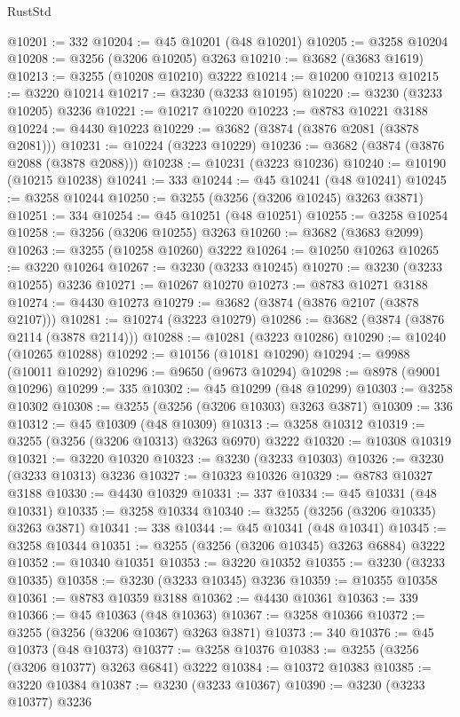 \begin{lexlean}{RustStd}
\begin{coremodule}
@10201 := 332
@10204 := @45 @10201 (@48 @10201)
@10205 := @3258 @10204
@10208 := @3256 (@3206 @10205) @3263
@10210 := @3682 (@3683 @1619)
@10213 := @3255 (@10208 @10210) @3222
@10214 := @10200 @10213
@10215 := @3220 @10214
@10217 := @3230 (@3233 @10195)
@10220 := @3230 (@3233 @10205) @3236
@10221 := @10217 @10220
@10223 := @8783 @10221 @3188
@10224 := @4430 @10223
@10229 := @3682 (@3874 (@3876 @2081 (@3878 @2081)))
@10231 := @10224 (@3223 @10229)
@10236 := @3682 (@3874 (@3876 @2088 (@3878 @2088)))
@10238 := @10231 (@3223 @10236)
@10240 := @10190 (@10215 @10238)
@10241 := 333
@10244 := @45 @10241 (@48 @10241)
@10245 := @3258 @10244
@10250 := @3255 (@3256 (@3206 @10245) @3263 @3871)
@10251 := 334
@10254 := @45 @10251 (@48 @10251)
@10255 := @3258 @10254
@10258 := @3256 (@3206 @10255) @3263
@10260 := @3682 (@3683 @2099)
@10263 := @3255 (@10258 @10260) @3222
@10264 := @10250 @10263
@10265 := @3220 @10264
@10267 := @3230 (@3233 @10245)
@10270 := @3230 (@3233 @10255) @3236
@10271 := @10267 @10270
@10273 := @8783 @10271 @3188
@10274 := @4430 @10273
@10279 := @3682 (@3874 (@3876 @2107 (@3878 @2107)))
@10281 := @10274 (@3223 @10279)
@10286 := @3682 (@3874 (@3876 @2114 (@3878 @2114)))
@10288 := @10281 (@3223 @10286)
@10290 := @10240 (@10265 @10288)
@10292 := @10156 (@10181 @10290)
@10294 := @9988 (@10011 @10292)
@10296 := @9650 (@9673 @10294)
@10298 := @8978 (@9001 @10296)
@10299 := 335
@10302 := @45 @10299 (@48 @10299)
@10303 := @3258 @10302
@10308 := @3255 (@3256 (@3206 @10303) @3263 @3871)
@10309 := 336
@10312 := @45 @10309 (@48 @10309)
@10313 := @3258 @10312
@10319 := @3255 (@3256 (@3206 @10313) @3263 @6970) @3222
@10320 := @10308 @10319
@10321 := @3220 @10320
@10323 := @3230 (@3233 @10303)
@10326 := @3230 (@3233 @10313) @3236
@10327 := @10323 @10326
@10329 := @8783 @10327 @3188
@10330 := @4430 @10329
@10331 := 337
@10334 := @45 @10331 (@48 @10331)
@10335 := @3258 @10334
@10340 := @3255 (@3256 (@3206 @10335) @3263 @3871)
@10341 := 338
@10344 := @45 @10341 (@48 @10341)
@10345 := @3258 @10344
@10351 := @3255 (@3256 (@3206 @10345) @3263 @6884) @3222
@10352 := @10340 @10351
@10353 := @3220 @10352
@10355 := @3230 (@3233 @10335)
@10358 := @3230 (@3233 @10345) @3236
@10359 := @10355 @10358
@10361 := @8783 @10359 @3188
@10362 := @4430 @10361
@10363 := 339
@10366 := @45 @10363 (@48 @10363)
@10367 := @3258 @10366
@10372 := @3255 (@3256 (@3206 @10367) @3263 @3871)
@10373 := 340
@10376 := @45 @10373 (@48 @10373)
@10377 := @3258 @10376
@10383 := @3255 (@3256 (@3206 @10377) @3263 @6841) @3222
@10384 := @10372 @10383
@10385 := @3220 @10384
@10387 := @3230 (@3233 @10367)
@10390 := @3230 (@3233 @10377) @3236

\end{coremodule}
\end{lexlean}
